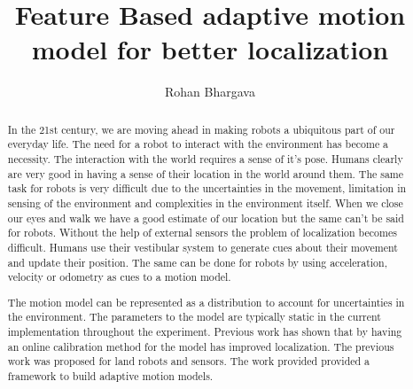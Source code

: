 \documentclass[12pt]{dalcsthesis}
\begin{document}
\mcs  %
\title{Feature Based adaptive motion model for better localization}
\author{Rohan Bhargava}


\providecommand{\tabularnewline}{\\}
\newcommand{\lyxdot}{.}

\frontmatter

\begin{abstract}
In the 21st century, we are moving ahead in making robots a ubiquitous part of our everyday life. The need for a robot to interact with the environment has become a necessity. The interaction with the world requires a sense of it's pose. Humans clearly are very good in having a sense of their location in the world around them. The same task for robots is very difficult due to the uncertainties in the movement, limitation in sensing of the environment and complexities in the environment itself. When we close our eyes and walk we have a good estimate of our location but the same can't be said for robots. Without the help of external sensors the problem of localization becomes difficult. Humans use their vestibular system to generate cues about their movement and update their position. The same can be done for robots by using acceleration, velocity or odometry as cues to a motion model. 

The motion model can be represented as a distribution to account for uncertainties in the environment. The parameters to the model are typically static in the current implementation throughout the experiment. Previous work has shown that by having an online calibration method for the model has improved localization. The previous work was proposed for land robots and sensors.  The work provided provided a framework to build adaptive motion models.


\end{abstract}
\end{document}
